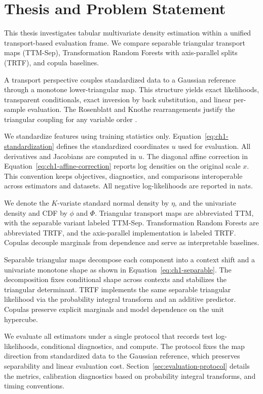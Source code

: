 \documentclass[11pt,a4paper,twoside]{book}\usepackage[]{graphicx}\usepackage[]{xcolor}
\begin{document}
\section{Thesis and Problem Statement}\label{sec:ch1-problem}
This thesis investigates tabular multivariate density estimation within a unified transport-based evaluation frame. We compare separable triangular transport maps (TTM-Sep), Transformation Random Forests with axis-parallel splits (TRTF), and copula baselines.
\medskip

A transport perspective couples standardized data to a Gaussian reference through a monotone lower-triangular map. This structure yields exact likelihoods, transparent conditionals, exact inversion by back substitution, and linear per-sample evaluation. The Rosenblatt and Knothe rearrangements justify the triangular coupling for any variable order \citep{rosenblatt1952remarks,knothe1957contributions}.
\medskip

We standardize features using training statistics only. Equation~\eqref{eq:ch1-standardization} defines the standardized coordinates $u$ used for evaluation. All derivatives and Jacobians are computed in $u$. The diagonal affine correction in Equation~\eqref{eq:ch1-affine-correction} reports log densities on the original scale $x$. This convention keeps objectives, diagnostics, and comparisons interoperable across estimators and datasets. All negative log-likelihoods are reported in nats.
\medskip

We denote the $K$-variate standard normal density by $\eta$, and the univariate density and CDF by $\phi$ and $\Phi$. Triangular transport maps are abbreviated TTM, with the separable variant labeled TTM-Sep. Transformation Random Forests are abbreviated TRTF, and the axis-parallel implementation is labeled TRTF. Copulas decouple marginals from dependence and serve as interpretable baselines.
\medskip

Separable triangular maps decompose each component into a context shift and a univariate monotone shape as shown in Equation~\eqref{eq:ch1-separable}. The decomposition fixes conditional shape across contexts and stabilizes the triangular determinant. TRTF implements the same separable triangular likelihood via the probability integral transform and an additive predictor. Copulas preserve explicit marginals and model dependence on the unit hypercube.

We evaluate all estimators under a single protocol that records test log-likelihoods, conditional diagnostics, and compute. The protocol fixes the map direction from standardized data to the Gaussian reference, which preserves separability and linear evaluation cost. Section~\ref{sec:evaluation-protocol} details the metrics, calibration diagnostics based on probability integral transforms, and timing conventions.
\end{document}
